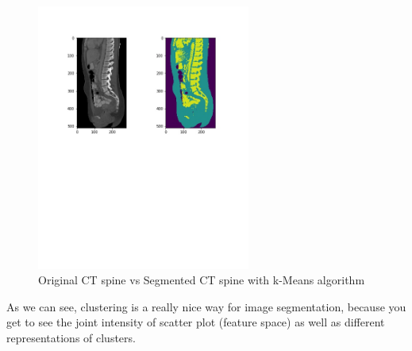 \newpage
\begin{figure}[h]
    \centering \includegraphics[width=7cm]{images/ct-spine-k-means-segmented.jpg}
    \vspace*{-40mm} \caption {Original CT spine vs Segmented CT spine with k-Means algorithm}
\end{figure}    

As we can see, clustering is a really nice way for image segmentation, because you get to see the joint intensity of scatter plot (feature space) as well as different representations of clusters.  

